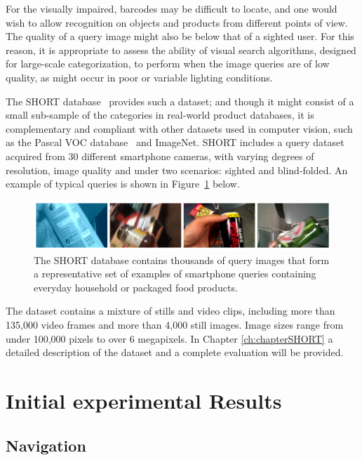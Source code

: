 For the visually impaired, barcodes may be difficult to locate, and one would wish to allow recognition on objects and products from different points of view. The quality of a query image might also be below that of a sighted user.  For this reason, it is appropriate to assess the ability of visual search algorithms, designed for large-scale categorization, to perform when the image queries are of low quality, as might occur in poor or variable lighting conditions.

The SHORT database~\cite{Rivera-Rubio2013a} provides such a dataset; and though it might consist of a small sub-sample of the categories in real-world product databases, it is  complementary and compliant with other datasets used in computer vision, such as the Pascal VOC database~\cite{Everingham2009} and ImageNet.  SHORT includes a query dataset acquired from 30 different smartphone cameras, with varying degrees of resolution, image quality and under two scenarios: sighted and blind-folded.  An example of typical queries is shown in Figure~\ref{fig:ShortQueries} below.

\begin{figure}
\centering
\includegraphics[width=\textwidth]{./gfx/Chapter02/TestDatasetCollage4imgs.jpg}
\caption{The SHORT database contains thousands of query images that form a representative set of examples of smartphone queries containing everyday household or packaged food products.}
\label{fig:ShortQueries}
\end{figure}

The dataset contains a mixture of stills and video clips, including more than 135,000 video frames and more than 4,000 still images.  Image sizes range from under 100,000 pixels to over 6 megapixels. In Chapter \ref{ch:chapterSHORT} a detailed description of the dataset and a complete evaluation will be provided.



\section{Initial experimental Results} \label{sec:expResults}

\subsection{Navigation}

